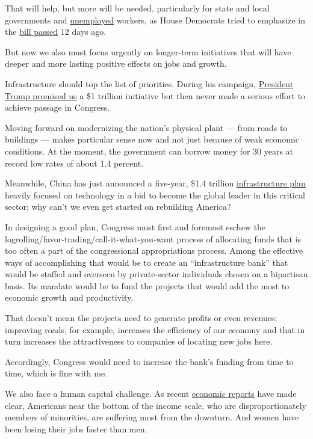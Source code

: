That will help, but more will be needed, particularly for state and
local governments and
\href{https://www.nytimes.com/2020/05/28/business/economy/coronavirus-stimulus-unemployment.html}{unemployed}
workers, as House Democrats tried to emphasize in the
\href{https://www.nytimes.com/2020/05/15/us/politics/house-simulus-vote.html}{bill
passed} 12 days ago.

But now we also must focus urgently on longer-term initiatives that will
have deeper and more lasting positive effects on jobs and growth.

Infrastructure should top the list of priorities. During his campaign,
\href{https://www.nytimes.com/2016/08/03/us/politics/trump-clinton-infrastructure.html}{President
Trump promised us} a \$1 trillion initiative but then never made a
serious effort to achieve passage in Congress.

Moving forward on modernizing the nation's physical plant --- from roads
to buildings --- makes particular sense now and not just because of weak
economic conditions. At the moment, the government can borrow money for
30 years at record low rates of about 1.4 percent.

Meanwhile, China has just announced a five-year, \$1.4 trillion
\href{https://www.bloomberg.com/news/articles/2020-05-20/china-has-a-new-1-4-trillion-plan-to-overtake-the-u-s-in-tech?sref=qN0DZypA}{infrastructure
plan} heavily focused on technology in a bid to become the global leader
in this critical sector; why can't we even get started on rebuilding
America?

In designing a good plan, Congress must first and foremost eschew the
logrolling/favor-trading/call-it-what-you-want process of allocating
funds that is too often a part of the congressional appropriations
process. Among the effective ways of accomplishing that would be to
create an ``infrastructure bank'' that would be staffed and overseen by
private-sector individuals chosen on a bipartisan basis. Its mandate
would be to fund the projects that would add the most to economic growth
and productivity.

That doesn't mean the projects need to generate profits or even
revenues; improving roads, for example, increases the efficiency of our
economy and that in turn increases the attractiveness to companies of
locating new jobs here.

Accordingly, Congress would need to increase the bank's funding from
time to time, which is fine with me.

We also face a human capital challenge. As recent
\href{https://www.nytimes.com/aponline/2020/05/08/business/bc-us-economy-jobs-report-inequality.html}{economic
reports} have made clear, Americans near the bottom of the income scale,
who are disproportionately members of minorities, are suffering most
from the downturn. And women have been losing their jobs faster than
men.

